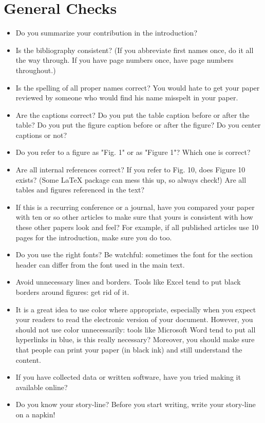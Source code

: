 \section{General Checks}
\begin{itemize}

\item Do you summarize your contribution in the introduction?
\item Is the bibliography consistent? (If you abbreviate first names once, do it all the way through. If you have page numbers once, have page numbers throughout.)
\item Is the spelling of all proper names correct? You would hate to get your paper reviewed by someone who would find his name misspelt in your paper.
\item Are the captions correct? Do you put the table caption before or after the table? Do you put the figure caption before or after the figure? Do you center captions or not?
\item Do you refer to a figure as "Fig. 1" or as "Figure 1"? Which one is correct?
\item Are all internal references correct? If you refer to Fig. 10, does Figure 10 exists? (Some LaTeX package can mess this up, so always check!) Are all tables and figures referenced in the text?
\item If this is a recurring conference or a journal, have you compared your paper with ten or so other articles to make sure that yours is consistent with how these other papers look and feel? For example, if all published articles use 10 pages for the introduction, make sure you do too.
\item Do you use the right fonts? Be watchful: sometimes the font for the section header can differ from the font used in the main text.
\item Avoid unnecessary lines and borders. Tools like Excel tend to put black borders around figures: get rid of it.
\item It is a great idea to use color where appropriate, especially when you expect your readers to read the electronic version of your document. However, you should not use color unnecessarily: tools like Microsoft Word tend to put all hyperlinks in blue, is this really necessary? Moreover, you should make sure that people can print your paper (in black ink) and still understand the content.
\item If you have collected data or written software, have you tried making it available online?
\item Do you know your story-line? Before you start writing, write your story-line on a napkin!

\end{itemize}
